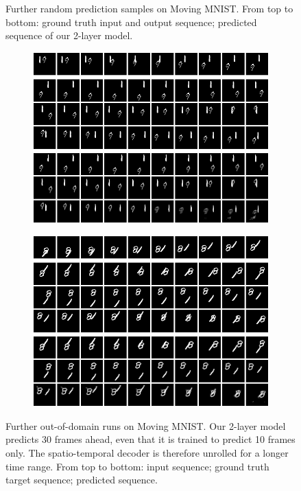 \begin{figure}[htpb]
\begin{subfigure}{0.49\textwidth}
  \caption{}
  \label{fig:mm-pred-random4}
\end{subfigure}
\caption[Random Prediction Samples on Moving MNIST]{Further random prediction samples on Moving MNIST. From top to bottom: ground truth input and output sequence; predicted sequence of our 2-layer model.} \label{fig:mm-pred-random}
\end{figure}

\begin{figure}[htpb]
\centering
\begin{subfigure}{0.5\textwidth}
  \centering
  \includegraphics[width=0.9\linewidth]{figures/pred/mm/long/prediction-00.png}
  \caption{}
  \label{fig:mm-pred-long1}
\end{subfigure}%
\begin{subfigure}{0.5\textwidth}
  \centering
  \includegraphics[width=0.9\linewidth]{figures/pred/mm/long/prediction-07.png}
  \caption{}
  \label{fig:mm-pred-long2}
\end{subfigure}
\caption[Long-Term Prediction on Moving MNIST]{Further out-of-domain runs on Moving MNIST. Our 2-layer model predicts 30 frames ahead, even that it is trained to predict 10 frames only. The spatio-temporal decoder is therefore unrolled for a longer time range. From top to bottom: input sequence; ground truth target sequence; predicted sequence.} \label{fig:mm-pred-long}
\end{figure}

